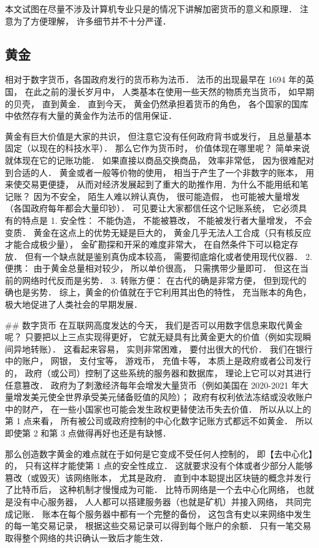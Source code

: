 
本文试图在尽量不涉及计算机专业只是的情况下讲解加密货币的意义和原理． 注意为了方便理解， 许多细节并不十分严谨．

\subsection{黄金}
相对于数字货币，各国政府发行的货币称为法币． 法币的出现最早在 1694 年的英国， 在此之前的漫长岁月中， 人类基本在使用一些天然的物质充当货币， 如早期的贝壳， 直到黄金． 直到今天， 黄金仍然承担着货币的角色， 各个国家的国库中依然存有大量的黄金作为法币的信用保证．

黄金有巨大价值是大家的共识， 但注意它没有任何政府背书或发行， 且总量基本固定（以现在的科技水平）． 那么它作为货币时， 价值体现在哪里呢？ 简单来说就体现在它的记账功能． 如果直接以商品交换商品， 效率非常低， 因为很难配对到合适的人． 黄金或者一般等价物的使用， 相当于产生了一个非数字的账本， 用来使交易更便捷， 从而对经济发展起到了重大的助推作用．为什么不能用纸和笔记账？ 因为不安全， 陌生人难以辨认真伪， 很可能造假， 也可能被大量增发（各国政府每年都会大量印钞）． 可见要让大家都信任这个记账系统， 它必须具有的特点是
1. 安全性： 不能伪造， 不能被篡改， 不能被发行者大量增发， 不会变质． 黄金在这点上的优势无疑是巨大的， 黄金几乎无法人工合成（只有核反应才能合成极少量）， 金矿勘探和开采的难度非常大， 在自然条件下可以稳定存放． 但有一个缺点就是鉴别真伪成本较高， 需要彻底熔化或者使用现代仪器．
2. 便携： 由于黄金总量相对较少， 所以单价很高， 只需携带少量即可． 但这在当前的网络时代反而是劣势．
3. 转账方便： 在古代的确是非常方便， 但到现代的确也是劣势．
综上，黄金的价值就在于它利用其出色的特性， 充当账本的角色， 极大地促进了人类社会的早期发展．

## 数字货币
在互联网高度发达的今天， 我们是否可以用数字信息来取代黄金呢？ 只要把以上三点实现得更好， 它就无疑具有比黄金更大的价值（例如实现瞬间异地转账）． 这看起来容易， 实则非常困难， 要付出很大的代价． 我们在银行中的账户， 网银， 支付宝等， 游戏币， 充值卡等， 本质上是政府或者公司发行的， 政府（或公司）控制了这些系统的服务器和数据库， 理论上它可以对其进行任意篡改． 政府为了刺激经济每年会增发大量货币（例如美国在 2020-2021 年大量增发美元使全世界承受美元储备贬值的风险）； 政府有权利依法冻结或没收账户中的财产， 在一些小国家也可能会发生政权更替使法币失去价值． 所以从以上的第 1 点来看， 所有被公司或政府控制的中心化数字记账方式都远不如黄金． 所以即使第 2 和第 3 点做得再好也还是有缺憾．

那么创造数字黄金的难点就在于如何是它变成不受任何人控制的， 即【去中心化】的， 只有这样才能使第 1 点的安全性成立． 这就要求没有个体或者少部分人能够篡改（或毁灭）该网络账本， 尤其是政府． 直到中本聪提出区块链的概念并发行了比特币后， 这种机制才慢慢成为可能． 比特币网络是一个去中心化网络， 也就是没有中心服务器， 人人都可以搭建服务器（也就是矿机）并接入网络， 共同完成记账． 账本在每个服务器中都有一个完整的备份， 这包含有史以来网络中发生的每一笔交易记录， 根据这些交易记录可以得到每个账户的余额． 只有一笔交易取得整个网络的共识确认一致后才能生效．


